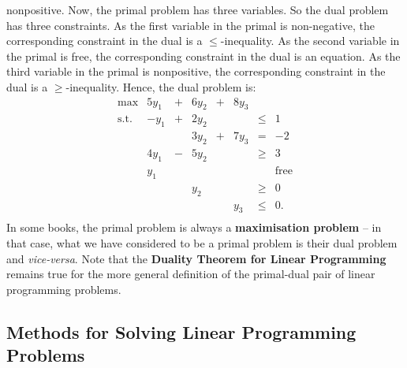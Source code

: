 nonpositive. Now, the primal problem has three variables. So the dual
problem has three constraints. As the first variable in the primal is
non-negative, the corresponding constraint in the dual is a
\(\leq\)-inequality. As the second variable in the primal is free, the
corresponding constraint in the dual is an equation. As the third
variable in the primal is nonpositive, the corresponding constraint in
the dual is a \(\geq\)-inequality. Hence, the dual problem is:
\[\begin{array}{rrcrcrcl}
\max & 5y_1 & + & 6y_2 & + & 8y_3 & \\
\mbox{s.t.} & -y_1 & + & 2y_2 &   &      & \leq &  1 \\
            &      &   & 3y_2 & + & 7y_3 & = & -2 \\
            & 4y_1 & - & 5y_2 &   &      & \geq &  3 \\
            &  y_1 &   &      &   &      &      &  \mbox{free} \\
            &     &    & y_2  &   &      & \geq & 0 \\
            &     &    &      &   & y_3  & \leq & 0.\\
\end{array}\]
In some books, the primal problem is always a \textbf{maximisation problem} -- in that case, what we have considered to be a primal problem is their dual problem and \textit{vice-versa}. Note that the \textbf{Duality Theorem for Linear Programming} remains true for the more general definition of the primal-dual pair of linear programming problems.

\subsection{Methods for Solving Linear Programming Problems}

